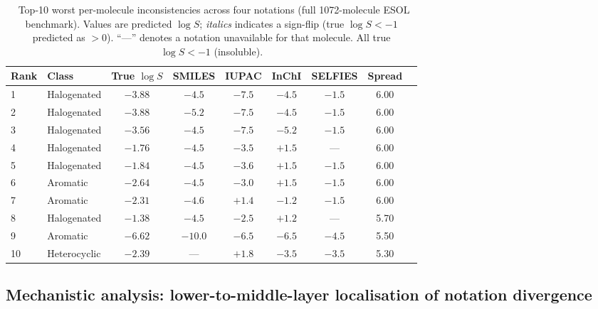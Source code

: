 \documentclass[twoside,twocolumn,9pt]{article}
\newcommand{\logS}{\ensuremath{\log S}}
\begin{document}
\begin{table}
\small
\caption{\ Top-10 worst per-molecule inconsistencies across four notations (full 1072-molecule ESOL benchmark). Values are predicted $\logS$; \textit{italics} indicates a sign-flip (true $\logS < -1$ predicted as $>0$). ``---'' denotes a notation unavailable for that molecule. All true $\logS < -1$ (insoluble).}
\label{tbl:top10}
\begin{tabular*}{\textwidth}{@{\extracolsep{\fill}}llccccccc}
\hline
Rank & Class & True $\logS$ & SMILES & IUPAC & InChI & SELFIES & Spread \\
\hline
1  & Halogenated & $-3.88$ & $-4.5$ & $-7.5$ & $-4.5$ & $-1.5$ & 6.00 \\
2  & Halogenated & $-3.88$ & $-5.2$ & $-7.5$ & $-4.5$ & $-1.5$ & 6.00 \\
3  & Halogenated & $-3.56$ & $-4.5$ & $-7.5$ & $-5.2$ & $-1.5$ & 6.00 \\
4  & Halogenated & $-1.76$ & $-4.5$ & $-3.5$ & \textit{$+1.5$} & --- & 6.00 \\
5  & Halogenated & $-1.84$ & $-4.5$ & $-3.6$ & \textit{$+1.5$} & $-1.5$ & 6.00 \\
6  & Aromatic    & $-2.64$ & $-4.5$ & $-3.0$ & \textit{$+1.5$} & $-1.5$ & 6.00 \\
7  & Aromatic    & $-2.31$ & $-4.6$ & \textit{$+1.4$} & $-1.2$ & $-1.5$ & 6.00 \\
8  & Halogenated & $-1.38$ & $-4.5$ & $-2.5$ & \textit{$+1.2$} & --- & 5.70 \\
9  & Aromatic    & $-6.62$ & $-10.0$ & $-6.5$ & $-6.5$ & $-4.5$ & 5.50 \\
10 & Heterocyclic& $-2.39$ & --- & \textit{$+1.8$} & $-3.5$ & $-3.5$ & 5.30 \\
\hline
\end{tabular*}
\end{table}

\subsection{Mechanistic analysis: lower-to-middle-layer localisation of notation divergence}
\end{document}
